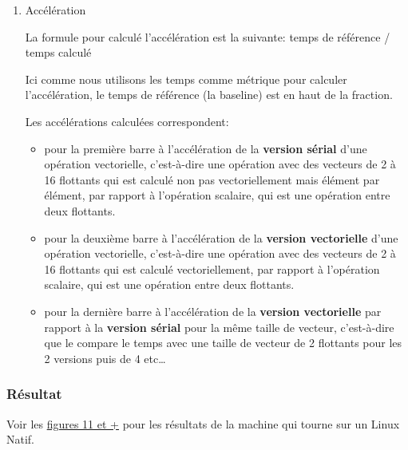 \documentclass[11pt, letterpaper]{article}
\begin{document}
\begin{enumerate}
\begin{enumerate}
\item Accélération
\label{sec:orgf3b367d}

La formule pour calculé l'accélération est la suivante:
temps de référence / temps calculé

Ici comme nous utilisons les temps comme métrique pour calculer
l'accélération, le temps de référence (la baseline) est en haut de la
fraction.

Les accélérations calculées correspondent:
\begin{itemize}
\item pour la première barre à l’accélération de la
\textbf{version sérial} d'une opération vectorielle, c'est-à-dire une opération
avec des vecteurs de 2 à 16 flottants qui est calculé non pas
vectoriellement mais élément par élément, par rapport à l'opération
scalaire, qui est une opération entre deux flottants.
\item pour la deuxième barre à l’accélération de la \textbf{version vectorielle} d'une
opération vectorielle, c'est-à-dire une opération avec des vecteurs de 2
à 16 flottants qui est calculé vectoriellement, par rapport à
l'opération scalaire, qui est une opération entre deux flottants.
\item pour la dernière barre à l’accélération de la \textbf{version vectorielle} par
rapport à la \textbf{version sérial} pour la même taille de vecteur,
c'est-à-dire que le compare le temps avec une taille de vecteur de 2
flottants pour les 2 versions puis de 4 etc\ldots{}
\end{itemize}
\end{enumerate}
\end{enumerate}

\subsubsection{Résultat}
\label{sec:org1c7c0b7}

Voir les \hyperref[orgf5d9dc4]{figures 11 et +} pour les résultats de la machine qui tourne sur un
Linux Natif.
\end{document}
